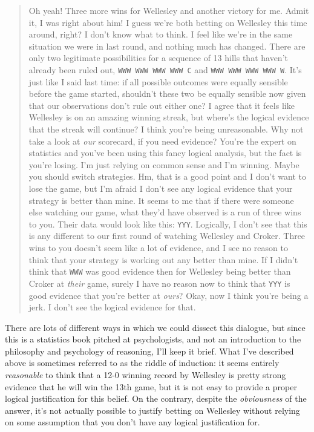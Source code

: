 \begin{quote}
\begin{dialogue}
 Oh yeah! Three more wins for Wellesley and another victory for me. Admit it, I was right about him! I guess we're both betting on Wellesley this time around, right?
 I don't know what to think. I feel like we're in the same situation we were in last round, and nothing much has changed. There are only two legitimate possibilities for a sequence of 13 hills that haven't already been ruled out, \texttt{WWW WWW WWW WWW C} and \texttt{WWW WWW WWW WWW W}. It's just like I said last time: if all possible outcomes were equally sensible before the game started, shouldn't these two be equally sensible now given that our observations don't rule out either one? I agree that it feels like Wellesley is on an amazing winning streak, but where's the logical evidence that the streak will continue?
 I think you're being unreasonable. Why not take a look at {\it our} scorecard, if you need evidence? You're the expert on statistics and you've been using this fancy logical analysis, but the fact is you're losing. I'm just relying on common sense and I'm winning. Maybe you should switch strategies.
 Hm, that is a good point and I don't want to lose the game, but I'm afraid I don't see any logical evidence that your strategy is better than mine. It seems to me that if there were someone else watching our game, what they'd have observed is a run of three wins to you. Their data would look like this: \texttt{YYY}. Logically, I don't see that this is any different to our first round of watching Wellesley and Croker. Three wins to you doesn't seem like a lot of evidence, and I see no reason to think that your strategy is working out any better than mine. If I didn't think that \texttt{WWW} was good evidence then for Wellesley being better than Croker at {\it their} game, surely I have no reason now to think that \texttt{YYY} is good evidence that you're better at {\it ours}?
 Okay, now I think you're being a jerk.
 I don't see the logical evidence for that.
\end{dialogue}
\end{quote}


There are lots of different ways in which we could dissect this dialogue, but since this is a statistics book pitched at psychologists, and not an introduction to the philosophy and psychology of reasoning, I'll keep it brief. What I've described above is sometimes referred to as the riddle of induction: it seems entirely {\it reasonable} to think that a 12-0 winning record by Wellesley is pretty strong evidence that he will win the 13th game, but it is not easy to provide a proper logical justification for this belief. On the contrary, despite the {\it obviousness} of the answer, it's not actually possible to justify betting on Wellesley without relying on some assumption that you don't have any logical justification for. 

